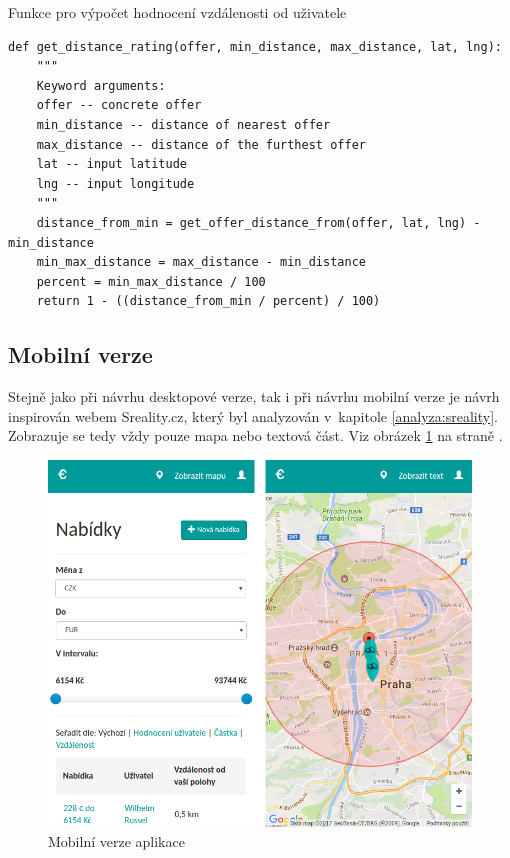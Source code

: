 \begin{listing}[htbp]
\caption{\label{code:sorting-distance}Funkce pro výpočet hodnocení vzdálenosti od uživatele}
\begin{verbatim}
def get_distance_rating(offer, min_distance, max_distance, lat, lng):
    """
    Keyword arguments:
    offer -- concrete offer
    min_distance -- distance of nearest offer
    max_distance -- distance of the furthest offer
    lat -- input latitude
    lng -- input longitude
    """
    distance_from_min = get_offer_distance_from(offer, lat, lng) - min_distance
    min_max_distance = max_distance - min_distance
    percent = min_max_distance / 100
    return 1 - ((distance_from_min / percent) / 100)
\end{verbatim}
\end{listing}

\subsection{Mobilní verze}
Stejně jako při návrhu desktopové verze, tak i při návrhu mobilní verze je návrh inspirován webem Sreality.cz, který byl analyzován v~kapitole \ref{analyza:sreality}. Zobrazuje se tedy vždy pouze mapa nebo textová část. Viz obrázek \ref{fig:tur:homepage-mobile} na straně \pageref{fig:tur:homepage-mobile}.

\begin{figure}[!h]
    \centering
    \includegraphics[width=1.0\textwidth]{media/tur/homepage-mobile.png}
    \caption{Mobilní verze aplikace}
    \label{fig:tur:homepage-mobile}
\end{figure}

